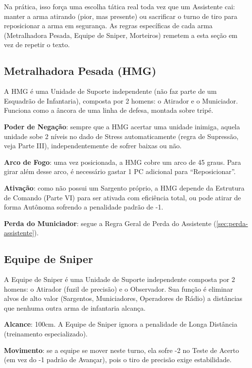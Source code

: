 \begin{nota}
Na prática, isso força uma escolha tática real toda vez que um Assistente cai: manter a arma atirando (pior, mas presente) ou sacrificar o turno de tiro para reposicionar a arma em segurança. As regras específicas de cada arma (Metralhadora Pesada, Equipe de Sniper, Morteiros) remetem a esta seção em vez de repetir o texto.
\end{nota}

\subsection{Metralhadora Pesada (HMG)}

A HMG é uma Unidade de Suporte independente (não faz parte de um Esquadrão de Infantaria), composta por 2 homens: o Atirador e o Municiador. Funciona como a âncora de uma linha de defesa, montada sobre tripé.

\textbf{Poder de Negação}: sempre que a HMG acertar uma unidade inimiga, aquela unidade sobe 2 níveis no dado de Stress automaticamente (regra de Supressão, veja Parte III), independentemente de sofrer baixas ou não.

\textbf{Arco de Fogo}: uma vez posicionada, a HMG cobre um arco de 45 graus. Para girar além desse arco, é necessário gastar 1 PC adicional para ``Reposicionar''.

\textbf{Ativação}: como não possui um Sargento próprio, a HMG depende da Estrutura de Comando (Parte VI) para ser ativada com eficiência total, ou pode atirar de forma Autônoma sofrendo a penalidade padrão de -1.

\textbf{Perda do Municiador}: segue a Regra Geral de Perda do Assistente (\ref{sec:perda-assistente}).

\subsection{Equipe de Sniper}
\label{sec:equipe-sniper}

A Equipe de Sniper é uma Unidade de Suporte independente composta por 2 homens: o Atirador (fuzil de precisão) e o Observador. Sua função é eliminar alvos de alto valor (Sargentos, Municiadores, Operadores de Rádio) a distâncias que nenhuma outra arma de infantaria alcança.

\textbf{Alcance}: 100cm. A Equipe de Sniper ignora a penalidade de Longa Distância (treinamento especializado).

\textbf{Movimento}: se a equipe se mover neste turno, ela sofre -2 no Teste de Acerto (em vez do -1 padrão de Avançar), pois o tiro de precisão exige estabilidade.

